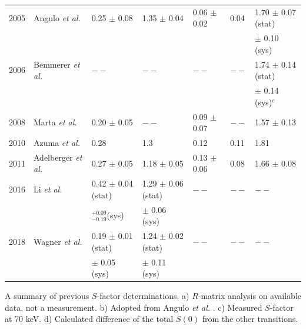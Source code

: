 \begin{table}
\begin{threeparttable}
\begin{tabular}{@{}lllllll@{}}
2005 & Angulo \textit{et al.} \cite{Angulo2005}                  & 0.25 $\pm$ 0.08                                 & 1.35 $\pm$ 0.04                         & 0.06 $\pm$ 0.02                & 0.04         & 1.70 $\pm$ 0.07 (stat)       \\
 & & & & & & $\pm$ 0.10 (sys) \\
2006 & Bemmerer \textit{et al.} \cite{Bemmerer2006}              & $--$                                            & $--$                                    & $--$                           & $--$         & 1.74 $\pm$ 0.14 (stat)  \\
 & & & & & & $\pm$ 0.14 (sys)$^{c}$ \\
2008 & Marta \textit{et al.} \cite{Marta2008}                    & 0.20 $\pm$ 0.05                                 & $--$                                    & 0.09 $\pm$ 0.07                & $--$         & 1.57 $\pm$ 0.13                               \\
2010 & Azuma \textit{et al.} \cite{Azuma2010}                    & 0.28                                            & 1.3                                     & 0.12                           & 0.11         & 1.81                                          \\
2011 & Adelberger \textit{et al.} \cite{Adelberger2011}          & 0.27 $\pm$ 0.05                                 & 1.18 $\pm$ 0.05                         & 0.13 $\pm$ 0.06                & 0.08         & 1.66 $\pm$ 0.08                               \\
2016 & Li \textit{et al.} \cite{Li2016}                          & 0.42 $\pm$ 0.04 (stat)   & 1.29 $\pm$ 0.06 (stat)  & $--$                           & $--$         & $--$                                          \\
 & & $^{+0.09}_{-0.19}$(sys) & $\pm$ 0.06 (sys) & & & \\
2018 & Wagner \textit{et al.} \cite{Wagner2018}                  & 0.19 $\pm$ 0.01 (stat)          & 1.24 $\pm$ 0.02 (stat) & $--$                           & $--$         & $--$                                          \\
 & & $\pm$ 0.05 (sys) &  $\pm$ 0.11 (sys)  & & & \\ \bottomrule
\end{tabular}
\begin{tablenotes}
\small 
\item A summary of previous $S$-factor determinations. a) $R$-matrix analysis on available data, not a measurement. b) Adopted from Angulo \textit{et al.} \cite{Angulo2001}. c) Measured $S$-factor at 70 keV. d) Calculated difference of the total $S(0)$ from the other transitions.
\end{tablenotes}
\end{threeparttable}
\label{table: s factors}
\end{table}

